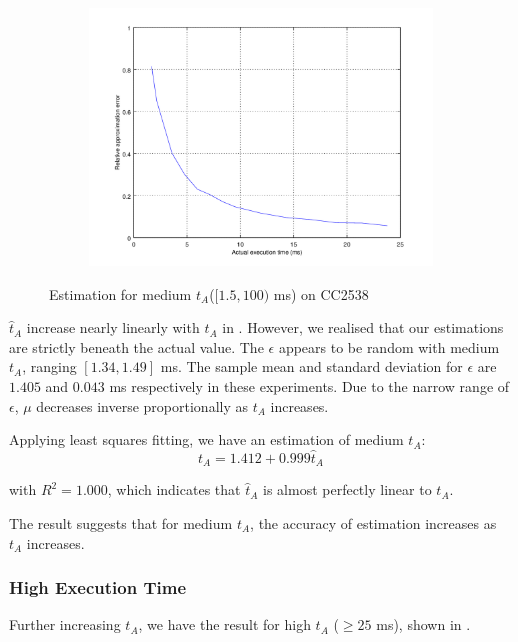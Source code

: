 \begin{figure}[ht!]
\begin{subfigure}{0.45\linewidth}
	\includegraphics[width=\linewidth]{fig/midrtvtaerr.png}
	\end{subfigure}
	\caption{Estimation for medium $t_A$($[1.5,100)$ ms) on CC2538}
	\label{Fig: Estimation for medium tA}
\end{figure}

$\hat{t}_A$ increase nearly linearly with $t_A$ in . However, we realised that our estimations are strictly beneath the actual value. The $\epsilon$ appears to be random with medium $t_A$,  ranging $[1.34, 1.49]$ ms.  The sample mean and standard deviation for $\epsilon$ are $1.405$ and $0.043$ ms respectively in these experiments. Due to the narrow range of $\epsilon$, $\mu$ decreases inverse proportionally as $t_A$ increases.

Applying least squares fitting, we have an estimation of medium $t_A$:
\begin{equation}
	t_A = 1.412 + 0.999\hat{t}_A 
\end{equation}

with $R^2=1.000$, which indicates that $\hat{t}_A$ is almost perfectly linear to $t_A$. 

The result suggests that for medium $t_A$, the accuracy of estimation increases as $t_A$ increases. 

\subsubsection{High Execution Time}

Further increasing $t_A$, we have the result for high $t_A$ ($\geq 25$ ms), shown in .

